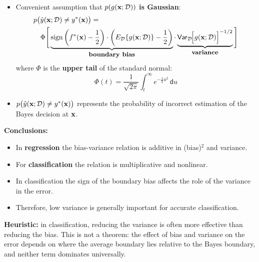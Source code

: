  \begin{itemize}
    \item Convenient assumption that \textbf{$p(g(\bm{\mathrm{x}}; \mathcal{D}))$ is Gaussian}:
      \begin{eqnarray*}
        \lefteqn{p\big(\hat y(\vect x;\mathcal D) \ne y^*(\vect x)\big) =} \\
        & & \Phi \Bigg[ 
              \underbrace{\sign\left(f^*(\vect x) - \frac{1}{2}\right) \cdot \left(E_{\mathcal{D}} \{ g(\vect x ; {\mathcal{D}}) \} - \frac{1}{2}\right) }_{\mbox{\small \textbf{boundary bias}}}
              \cdot \underbrace{\mathsf{Var}_{\mathcal D}\!\Big[g(\vect x ; {\mathcal{D}})\Big]^{-1/2}}_{\mbox{\small \textbf{variance}}}
            \Bigg]
      \end{eqnarray*}
      where $\Phi$ is the \textbf{upper tail} of the standard normal:
      \begin{displaymath}
        \Phi(t) = \frac{1}{\sqrt{2\pi}} \int_t^\infty e^{-\frac{1}{2} u^2} \, \mathsf{d}u
      \end{displaymath}
    \item $p\big(\hat y(\bm{\mathrm{x}};\mathcal D) \ne y^*(\bm{\mathrm{x}})\big)$ represents the probability of incorrect estimation of the Bayes decision at $\bm{\mathrm{x}}$.
  \end{itemize}
 
 \textbf{Conclusions:}

  \begin{itemize}
    \item In \textbf{regression} the bias-variance relation is additive in (bias)$^2$ and variance.     
    \item For \textbf {classification} the relation is multiplicative and nonlinear.        
    \item In classification the sign of the boundary bias affects the role of the variance in the error.            
    \item Therefore, low variance is generally important for accurate classification.
  \end{itemize}
         

 \textbf{Heuristic:} in classification, reducing the variance is often more effective than reducing the bias. This is not a theorem: the effect of bias and variance on the error depends on where the average boundary lies relative to the Bayes boundary, and neither term dominates universally.
  
  \def\covA{\mat{\Sigma}_i = \left(\begin{matrix} \sigma^2_{i1} & \sigma_{i12} \\ \sigma_{i12} & \sigma^2_{i2} \end{matrix}\right)}
  \def\covB{\mat{\Sigma}_i = \left(\begin{matrix} \sigma^2_{i1} & 0            \\ 0            & \sigma^2_{i2} \end{matrix}\right)}
  \def\covC{\mat{\Sigma}_i = \left(\begin{matrix} 1             & 0            \\ 0            & 1             \end{matrix}\right)}

